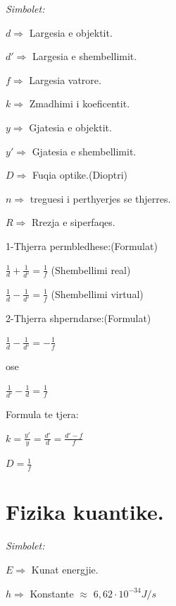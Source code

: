 \documentclass[twocolumn]{article}
\begin{document}
\begin{center}
\textit{	Simbolet:}
\end{center}

$d \Rightarrow $ Largesia e objektit.

$d' \Rightarrow$ Largesia e shembellimit.

$f \Rightarrow$ Largesia vatrore.

$k \Rightarrow $ Zmadhimi i koeficentit.

$y \Rightarrow$ Gjatesia e objektit.

$y' \Rightarrow$ Gjatesia e shembellimit.

$D \Rightarrow$ Fuqia optike.(Dioptri)

$n \Rightarrow$ treguesi i perthyerjes se thjerres.

$R \Rightarrow$ Rrezja e siperfaqes.

\begin{center}
	1-Thjerra permbledhese:(Formulat)
\end{center}

$\frac{1}{d}+\frac{1}{d'}=\frac{1}{f}$  (Shembellimi real)

$\frac{1}{d}-\frac{1}{d'}=\frac{1}{f}$  (Shembellimi virtual)


\begin{center}
	2-Thjerra shperndarse:(Formulat)
\end{center}

$\frac{1}{d}-\frac{1}{d'}=-\frac{1}{f}$ 

\begin{center}
	ose
\end{center}

$\frac{1}{d'}-\frac{1}{d}=\frac{1}{f}$ 

\begin{center}
	Formula te tjera:
\end{center}

$k=\frac{y'}{y}=\frac{d'}{d}=\frac{d'-f}{f}$

$D=\frac{1}{f}$


\section{Fizika kuantike.}

\begin{center}
	\textit{Simbolet:}
\end{center}

$E \Rightarrow$ Kunat energjie.

$h \Rightarrow$ Konstante $\approx$ $6,62 \cdot 10^{-34} J/s$
\end{document}
